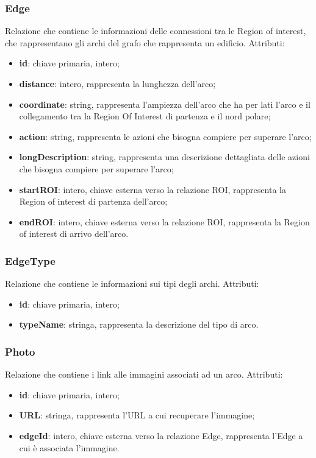\documentclass[../ManualeSviluppatore.tex]{subfiles}
\begin{document}
		\subsubsection{Edge}
		Relazione che contiene le informazioni delle connessioni tra le Region of interest, che rappresentano gli archi del grafo che rappresenta un edificio. Attributi:
			\begin{itemize}
			\item \textbf{id}: chiave primaria, intero;
			\item \textbf{distance}: intero, rappresenta la lunghezza dell'arco;
			\item \textbf{coordinate}: string, rappresenta l'ampiezza dell'arco che ha per lati l'arco e il collegamento tra la Region Of Interest di partenza e il nord polare; 
			\item \textbf{action}: string, rappresenta le azioni che bisogna compiere per superare l'arco;
			\item \textbf{longDescription}: string, rappresenta una descrizione dettagliata delle azioni che bisogna compiere per superare l'arco;
			\item \textbf{startROI}: intero, chiave esterna verso la relazione \gls{ROI}, rappresenta la Region of interest di partenza dell'arco;
			\item \textbf{endROI}: intero, chiave esterna verso la relazione \gls{ROI}, rappresenta la Region of interest di arrivo dell'arco.
			\end{itemize}
		\subsubsection{EdgeType}
		Relazione che contiene le informazioni sui tipi degli archi. Attributi:
			\begin{itemize}
			\item \textbf{id}: chiave primaria, intero;
			\item \textbf{typeName}: stringa, rappresenta la descrizione del tipo di arco.
			\end{itemize}
		\subsubsection{Photo}
		Relazione che contiene i link alle immagini associati ad un arco. Attributi:
			\begin{itemize}
			\item \textbf{id}: chiave primaria, intero;
			\item \textbf{URL}: stringa, rappresenta l'URL a cui recuperare l'immagine;
			\item \textbf{edgeId}: intero, chiave esterna verso la relazione Edge, rappresenta l'Edge a cui è associata l'immagine.
			\end{itemize}
\end{document}
